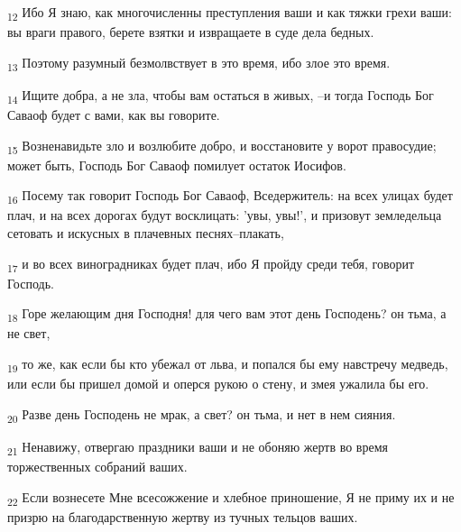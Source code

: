 \begin{tcolorbox}
\textsubscript{12} Ибо Я знаю, как многочисленны преступления ваши и как тяжки грехи ваши: вы враги правого, берете взятки и извращаете в суде дела бедных.
\end{tcolorbox}
\begin{tcolorbox}
\textsubscript{13} Поэтому разумный безмолвствует в это время, ибо злое это время.
\end{tcolorbox}
\begin{tcolorbox}
\textsubscript{14} Ищите добра, а не зла, чтобы вам остаться в живых, --и тогда Господь Бог Саваоф будет с вами, как вы говорите.
\end{tcolorbox}
\begin{tcolorbox}
\textsubscript{15} Возненавидьте зло и возлюбите добро, и восстановите у ворот правосудие; может быть, Господь Бог Саваоф помилует остаток Иосифов.
\end{tcolorbox}
\begin{tcolorbox}
\textsubscript{16} Посему так говорит Господь Бог Саваоф, Вседержитель: на всех улицах будет плач, и на всех дорогах будут восклицать: 'увы, увы!', и призовут земледельца сетовать и искусных в плачевных песнях--плакать,
\end{tcolorbox}
\begin{tcolorbox}
\textsubscript{17} и во всех виноградниках будет плач, ибо Я пройду среди тебя, говорит Господь.
\end{tcolorbox}
\begin{tcolorbox}
\textsubscript{18} Горе желающим дня Господня! для чего вам этот день Господень? он тьма, а не свет,
\end{tcolorbox}
\begin{tcolorbox}
\textsubscript{19} то же, как если бы кто убежал от льва, и попался бы ему навстречу медведь, или если бы пришел домой и оперся рукою о стену, и змея ужалила бы его.
\end{tcolorbox}
\begin{tcolorbox}
\textsubscript{20} Разве день Господень не мрак, а свет? он тьма, и нет в нем сияния.
\end{tcolorbox}
\begin{tcolorbox}
\textsubscript{21} Ненавижу, отвергаю праздники ваши и не обоняю жертв во время торжественных собраний ваших.
\end{tcolorbox}
\begin{tcolorbox}
\textsubscript{22} Если вознесете Мне всесожжение и хлебное приношение, Я не приму их и не призрю на благодарственную жертву из тучных тельцов ваших.
\end{tcolorbox}
